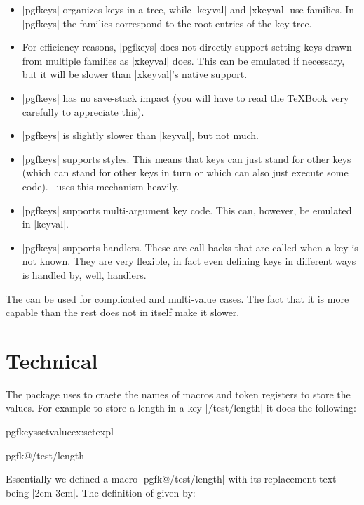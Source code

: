 \begin{itemize}
\item |pgfkeys| organizes keys in a tree, while |keyval| and |xkeyval|
  use families. In |pgfkeys| the families correspond to the root
  entries of the key tree.
\item For efficiency reasons, |pgfkeys| does not directly support
  setting keys drawn from multiple families as |xkeyval| does. This
  can be emulated if necessary, but it will be slower than |xkeyval|'s
  native support.
\item |pgfkeys| has no save-stack impact (you will have to read the
  \TeX Book very carefully to appreciate this).
\item |pgfkeys| is slightly slower than |keyval|, but not much.
\item |pgfkeys| supports styles. This means that keys can just stand
  for other keys (which can stand for other keys in turn or which can
  also just execute some code). \tikzname\ uses this mechanism heavily.
\item |pgfkeys| supports multi-argument key code. This can, however,
  be emulated in |keyval|.
\item |pgfkeys| supports handlers. These are call-backs that are
  called when a key is not known. They are very flexible, in fact even
  defining keys in different ways is handled by, well, handlers.
\end{itemize}

The \pgfname can be used for complicated and multi-value cases. The fact that it is
more capable than the rest does not in itself make it slower. 

\section{Technical}

The package uses  to craete the names of macros and token registers to store the values. For example to
store a length in a key |/test/length| it does the following:

\begin{texexample}{pgfkeyssetvalue}{ex:setexpl}
\makeatletter
\the\pgfkeys@temptoks

\csname pgfk@/test/length\endcsname
\makeatother
\end{texexample}

Essentially we defined a macro |pgfk@/test/length| with its replacement text being |2cm-3cm|. The definition
of  given by:

